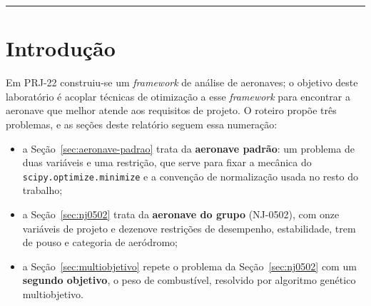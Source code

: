 \documentclass[11pt,a4paper]{article}
\newcommand{\code}[1]{\texttt{\small #1}}
\begin{document}
\begin{abstract}
\noindent
Este relatório resolve os três problemas de otimização do
\emph{Homework}~02 de PRJ-23, todos acoplados ao \emph{Design Tools}
desenvolvido em PRJ-22. No Problema~2, o MTOW da aeronave padrão
(Fokker~100) é minimizado com o SLSQP em relação a $AR_w$ e $S_w$, sob um
teto de envergadura de $30$~m: o MTOW cai $2{,}72\%$ em 33 avaliações da
função objetivo, e o ótimo resulta \emph{interior} --- a envergadura para
a $17$~cm do limite, resultado confirmado por quatro verificações
independentes. No Problema~3, a NJ-0502 herdada de PRJ-22 é otimizada com
onze variáveis e dezenove restrições normalizadas; $W_0$ cai $3{,}59\%$
em 8 avaliações da função objetivo, num ponto de KKT com nove restrições
ativas. No Problema~4, o mesmo problema é resolvido com dois objetivos
($W_0$ e $W_f$) pelo NSGA-II do \code{pymoo}, com 100 indivíduos por
geração e 400 gerações. A frente de Pareto resultante é
\emph{degenerada}: sob as restrições da letra~E da OACI (incluindo os
dois TE de raiz em $L_f$), os dois objetivos deixam de competir, e a
frente inteira cabe em $108$~kgf de $W_0$ --- $0{,}039\%$ do MTOW.
Relaxando o teto para a letra~F, a amplitude sobe cerca de 4 vezes, ainda
limitada pelos braços das empenagens sobre a fuselagem, o que identifica
a categoria de aeródromo e o layout da cauda --- e não a aerodinâmica ---
como o que governa o projeto.
\end{abstract}

\vspace{0.3cm}
\hrule
\vspace{0.5cm}

\section{Introdução}

Em PRJ-22 construiu-se um \emph{framework} de análise de aeronaves; o
objetivo deste laboratório é acoplar técnicas de otimização a esse
\emph{framework} para encontrar a aeronave que melhor atende aos
requisitos de projeto. O roteiro propõe três problemas, e as seções deste
relatório seguem essa numeração:

\begin{itemize}
\item a Seção~\ref{sec:aeronave-padrao} trata da \textbf{aeronave
      padrão}: um problema de duas variáveis e uma restrição, que serve
      para fixar a mecânica do \code{scipy.optimize.minimize} e a
      convenção de normalização usada no resto do trabalho;
\item a Seção~\ref{sec:nj0502} trata da \textbf{aeronave do grupo}
      (NJ-0502), com onze variáveis de projeto e dezenove restrições de
      desempenho, estabilidade, trem de pouso e categoria de aeródromo;
\item a Seção~\ref{sec:multiobjetivo} repete o problema da
      Seção~\ref{sec:nj0502} com um \textbf{segundo objetivo}, o peso de
      combustível, resolvido por algoritmo genético multiobjetivo.
\end{itemize}
\end{document}
